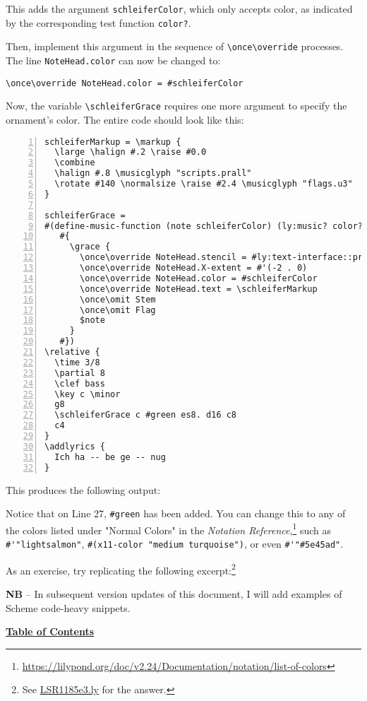 This adds the argument \verb|schleiferColor|, which only accepts color, as indicated by the corresponding test function \verb|color?|.

Then, implement this argument in the sequence of \verb+\once\override+ processes. The line \verb+NoteHead.color+ can now be changed to:

\begin{verbatim}
\once\override NoteHead.color = #schleiferColor
\end{verbatim}

Now, the variable \verb+\schleiferGrace+ requires one more argument to specify the ornament's color. The entire code should look like this:

\begin{Verbatim}[numbers=left,xleftmargin=5mm]
schleiferMarkup = \markup {
  \large \halign #.2 \raise #0.0
  \combine
  \halign #.8 \musicglyph "scripts.prall"
  \rotate #140 \normalsize \raise #2.4 \musicglyph "flags.u3"
}

schleiferGrace =
#(define-music-function (note schleiferColor) (ly:music? color?)
   #{
     \grace {
       \once\override NoteHead.stencil = #ly:text-interface::print
       \once\override NoteHead.X-extent = #'(-2 . 0)
       \once\override NoteHead.color = #schleiferColor
       \once\override NoteHead.text = \schleiferMarkup
       \once\omit Stem
       \once\omit Flag
       $note
     }
   #})
\relative {
  \time 3/8
  \partial 8
  \clef bass
  \key c \minor
  g8
  \schleiferGrace c #green es8. d16 c8
  c4
}
\addlyrics {
  Ich ha -- be ge -- nug
}
\end{Verbatim}

This produces the following output:

\hfill \break 

Notice that on Line 27, \verb+#green+ has been added. You can change this to any of the colors listed under "Normal Colors" in the \textit{Notation Reference},\footnote{\url{https://lilypond.org/doc/v2.24/Documentation/notation/list-of-colors}} such as \verb+#'"lightsalmon"+, \verb+#(x11-color "medium turquoise")+, or even \verb+#'"#5e45ad"+.

As an exercise, try replicating the following excerpt:\footnote{See \href{https://github.com/yoshiakionishi/lilypond-snippets/blob/main/DOCUMENT/LSR1185e3.ly}{LSR1185e3.ly} for the answer.}

\hfill \break

\textbf{NB} -- In subsequent version updates of this document, I will add examples of Scheme code-heavy snippets. 

\hyperref[sec:toc]{\textbf{Table of Contents}}

\vfill \break


